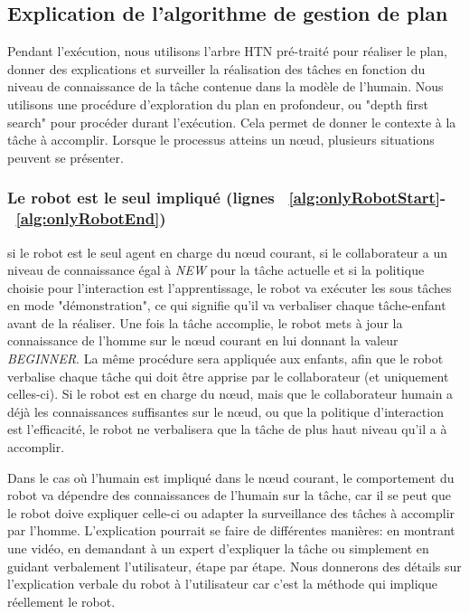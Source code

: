 \documentclass[a4paper,11pt,twoside]{StyleThese}
\begin{document}
\subsection{Explication de l'algorithme de gestion de plan}
Pendant l'exécution, nous utilisons l'arbre HTN pré-traité pour réaliser le plan, donner des explications et surveiller la réalisation des tâches en fonction du niveau de connaissance de la tâche contenue dans la modèle de l'humain.
Nous utilisons une procédure d'exploration du plan en profondeur, ou "depth first search" pour procéder durant l'exécution. Cela permet de donner le contexte à la tâche à accomplir.
Lorsque le processus atteins un nœud, plusieurs situations peuvent se présenter.

\subsubsection{Le robot est le seul impliqué (lignes ~\ref{alg:onlyRobotStart}-~\ref{alg:onlyRobotEnd})} si le robot est le seul agent en charge du nœud courant, si le collaborateur a un niveau de connaissance égal à \textit{NEW} pour la tâche actuelle et si la politique choisie pour l'interaction est l'apprentissage, le robot va exécuter les sous tâches en mode "démonstration", ce qui signifie qu'il va verbaliser chaque tâche-enfant avant de la réaliser. Une fois la tâche accomplie, le robot mets à jour la connaissance de l'homme sur le nœud courant en lui donnant la valeur \textit{BEGINNER}. La même procédure sera appliquée aux enfants, afin que le robot verbalise chaque tâche qui doit être apprise par le collaborateur (et uniquement celles-ci).
Si le robot est en charge du nœud, mais que le collaborateur humain a déjà les connaissances suffisantes sur le nœud, ou que la politique d'interaction est l'efficacité, le robot ne verbalisera que la tâche de plus haut niveau qu'il a à accomplir.

Dans le cas où l'humain est impliqué dans le nœud courant, le comportement du robot va dépendre des connaissances de l'humain sur la tâche, car il se peut que le robot doive expliquer celle-ci ou adapter la surveillance des tâches à accomplir par l'homme.
L'explication pourrait se faire de différentes manières: en montrant une vidéo, en demandant à un expert d'expliquer la tâche ou simplement en guidant verbalement l'utilisateur, étape par étape. Nous donnerons des détails sur l'explication verbale du robot à l'utilisateur car c'est la méthode qui implique réellement le robot.
\end{document}
